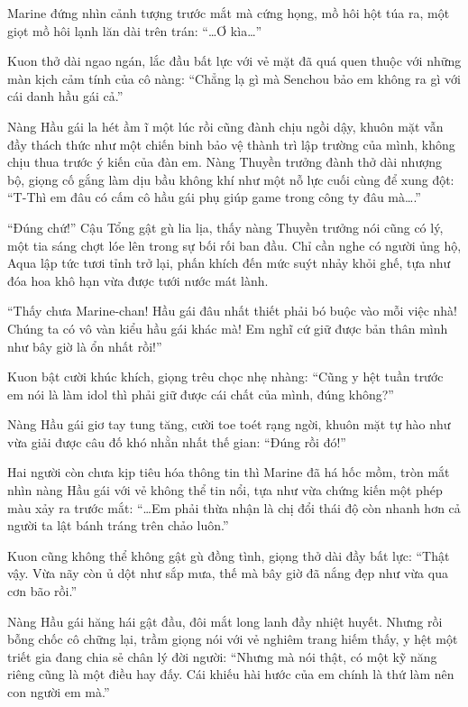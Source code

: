 \documentclass[../main.tex]{subfiles}
\begin{document}
Marine đứng nhìn cảnh tượng trước mắt mà cứng họng, mồ hôi hột túa ra, một giọt mồ hôi lạnh lăn dài trên trán: ``\dots Ơ kìa\dots''

Kuon thở dài ngao ngán, lắc đầu bất lực với vẻ mặt đã quá quen thuộc với những màn kịch cảm tính của cô nàng: ``Chẳng lạ gì mà Senchou bảo em không ra gì với cái danh hầu gái cả.''

Nàng Hầu gái la hét ầm ĩ một lúc rồi cũng đành chịu ngồi dậy, khuôn mặt vẫn đầy thách thức như một chiến binh bảo vệ thành trì lập trường của mình, không chịu thua trước ý kiến của đàn em. Nàng Thuyền trưởng đành thở dài nhượng bộ, giọng cố gắng làm dịu bầu không khí như một nỗ lực cuối cùng để xung đột: ``T-Thì em đâu có cấm cô hầu gái phụ giúp game trong công ty đâu mà\dots.''

``Đúng chứ!'' Cậu Tổng gật gù lia lịa, thấy nàng Thuyền trưởng nói cũng có lý, một tia sáng chợt lóe lên trong sự bối rối ban đầu. Chỉ cần nghe có người ủng hộ, Aqua lập tức tươi tỉnh trở lại, phấn khích đến mức suýt nhảy khỏi ghế, tựa như đóa hoa khô hạn vừa được tưới nước mát lành.

``Thấy chưa Marine-chan! Hầu gái đâu nhất thiết phải bó buộc vào mỗi việc nhà! Chúng ta có vô vàn kiểu hầu gái khác mà! Em nghĩ cứ giữ được bản thân mình như bây giờ là ổn nhất rồi!''

Kuon bật cười khúc khích, giọng trêu chọc nhẹ nhàng: ``Cũng y hệt tuần trước em nói là làm idol thì phải giữ được cái chất của mình, đúng không?''

Nàng Hầu gái giơ tay tung tăng, cười toe toét rạng ngời, khuôn mặt tự hào như vừa giải được câu đố khó nhằn nhất thế gian: ``Đúng rồi đó!''

Hai người còn chưa kịp tiêu hóa thông tin thì Marine đã há hốc mồm, tròn mắt nhìn nàng Hầu gái với vẻ không thể tin nổi, tựa như vừa chứng kiến một phép màu xảy ra trước mắt: ``\dots Em phải thừa nhận là chị đổi thái độ còn nhanh hơn cả người ta lật bánh tráng trên chảo luôn.''

Kuon cũng không thể không gật gù đồng tình, giọng thở dài đầy bất lực: ``Thật vậy. Vừa nãy còn ủ dột như sắp mưa, thế mà bây giờ đã nắng đẹp như vừa qua cơn bão rồi.''

Nàng Hầu gái hăng hái gật đầu, đôi mắt long lanh đầy nhiệt huyết. Nhưng rồi bỗng chốc cô chững lại, trầm giọng nói với vẻ nghiêm trang hiếm thấy, y hệt một triết gia đang chia sẻ chân lý đời người: ``Nhưng mà nói thật, có một kỹ năng riêng cũng là một điều hay đấy. Cái khiếu hài hước của em chính là thứ làm nên con người em mà.''
\end{document}
